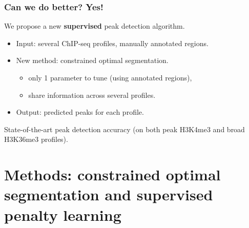 \documentclass{beamer}
\begin{document}
\begin{frame}
  \frametitle{Can we do better? Yes!}
  We propose a new \textbf{supervised} peak detection
  algorithm.
  \begin{itemize}
  \item Input: several ChIP-seq profiles, manually annotated regions.
  \item New method: constrained optimal segmentation.
    \begin{itemize}
      \item only 1 parameter to tune (using annotated regions),
      \item share information across several profiles.
    \end{itemize}
  \item Output: predicted peaks for each profile.
  \end{itemize}
  State-of-the-art peak detection accuracy (on both peak H3K4me3 and
  broad H3K36me3 profiles).
\end{frame}

\section{Methods: constrained optimal segmentation and 
  supervised penalty learning}
\end{document}
